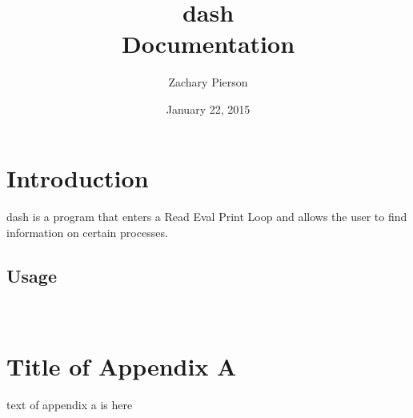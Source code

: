\documentclass[10pt]{article}
\title{\textbf{dash} \\Documentation}
\date{January 22, 2015}
\author{Zachary Pierson}
\begin{document}
\maketitle
\newpage

\tableofcontents
\newpage

\section{Introduction}
\paragraph{}
dash is a program that enters a Read Eval Print Loop and allows
the user to find information on certain processes.  

\subsection{Usage}
\subparagraph{}

\newpage
\appendix
\section{\\Title of Appendix A}
\label{App:AppendixA}
text of appendix a is here
\end{document}
